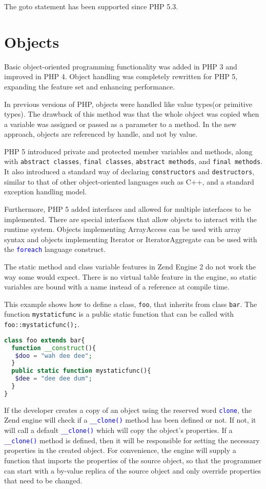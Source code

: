 The goto statement has been supported since PHP 5.3.


\chapter{Objects}


Basic object-oriented programming functionality was added in PHP 3 and improved in PHP 4. Object handling was completely rewritten for PHP 5, expanding the feature set and enhancing performance. 

In previous versions of PHP, objects were handled like value types(or primitive types). The drawback of this method was that the whole object was copied when a variable was assigned or passed as a parameter to a method. In the new approach, objects are referenced by handle, and not by value. 

PHP 5 introduced private and protected member variables and methods, along with \texttt{abstract classes}, \texttt{final classes}, \texttt{abstract methods}, and \texttt{final methods}. It also introduced a standard way of declaring \texttt{constructors} and \texttt{destructors}, similar to that of other object-oriented languages such as C++, and a standard exception handling model. 

Furthermore, PHP 5 added interfaces and allowed for multiple interfaces to be implemented. There are special interfaces that allow objects to interact with the runtime system. Objects implementing ArrayAccess can be used with array syntax and objects implementing Iterator or IteratorAggregate can be used with the \textcolor{Blue}{\texttt{foreach}} language construct. 

The static method and class variable features in Zend Engine 2 do not work the way some would expect. There is no virtual table feature in the engine, so static variables are bound with a name instead of a reference at compile time.


This example shows how to define a class, \texttt{foo}, that inherits from class \texttt{bar}. The function \texttt{mystaticfunc} is a public static function that can be called with \texttt{foo::mystaticfunc();}.


\begin{lstlisting}[language=PHP]
class foo extends bar{
  function __construct(){
   $doo = "wah dee dee";
  }
  public static function mystaticfunc(){
   $dee = "dee dee dum";
  }
}
\end{lstlisting}


If the developer creates a copy of an object using the reserved word \textcolor{Blue}{\texttt{clone}}, the Zend engine will check if a \textcolor{Blue}{\texttt{\_\_clone()}} method has been defined or not. If not, it will call a default \textcolor{Blue}{\texttt{\_\_clone()}} which will copy the object's properties. If a \textcolor{Blue}{\texttt{\_\_clone()}} method is defined, then it will be responsible for setting the necessary properties in the created object. For convenience, the engine will supply a function that imports the properties of the source object, so that the programmer can start with a by-value replica of the source object and only override properties that need to be changed.

